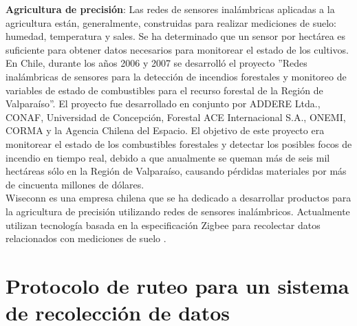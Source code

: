 \textbf{Agricultura de precisión}: Las redes de sensores inalámbricas aplicadas a la agricultura están, generalmente, construidas para realizar mediciones de suelo: humedad, temperatura y sales. Se ha determinado que un sensor por hectárea es suficiente para obtener datos necesarios para monitorear el estado de los cultivos.\\


En Chile, durante los años 2006 y 2007 se desarrolló el proyecto ''Redes inalámbricas de sensores para la detección de incendios forestales y monitoreo de variables de estado de combustibles para el recurso forestal de la Región de Valparaíso''\cite{ProyectoForestal}. El proyecto fue desarrollado en conjunto por ADDERE Ltda., CONAF, Universidad de Concepción, Forestal ACE Internacional S.A., ONEMI, CORMA y la Agencia Chilena del Espacio. El objetivo de este proyecto era monitorear el estado de los combustibles forestales y detectar los posibles focos de incendio en tiempo real, debido a que anualmente se queman más de seis mil hectáreas sólo en la Región de Valparaíso, causando pérdidas materiales por más de cincuenta millones de dólares.\\

Wiseconn es una empresa chilena que se ha dedicado a desarrollar productos para la agricultura de precisión utilizando redes de sensores inalámbricos. Actualmente utilizan tecnología basada en la especificación Zigbee para recolectar datos relacionados con mediciones de suelo \cite{Wiseconn}.


\section{Protocolo de ruteo para un sistema de recolección de datos}

